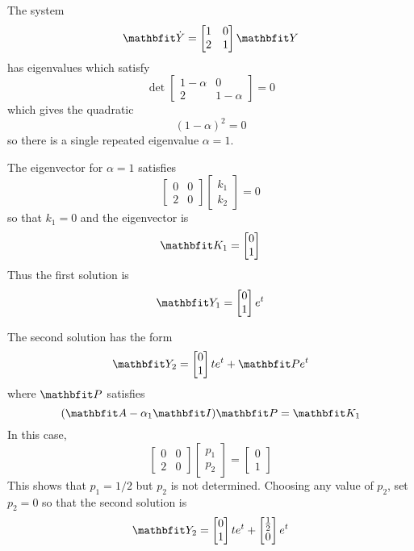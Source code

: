 \begin{example}
The system
$$\vect{\dot{Y}}=\begin{bmatrix} 1 & 0 \\ 2 & 1 \end{bmatrix} \vect{Y}$$
has eigenvalues which satisfy
$$\det \begin{bmatrix} 1-\alpha & 0 \\ 2 & 1-\alpha \end{bmatrix}=0$$
which gives the quadratic
$$(1-\alpha)^2=0$$
so there is a single repeated eigenvalue $\alpha=1$.

The eigenvector for $\alpha=1$ satisfies
$$\begin{bmatrix} 0 & 0 \\ 2 & 0\end{bmatrix}
\begin{bmatrix}k_1 \\ k_2 \end{bmatrix}=0$$
so that $k_1=0$ and the eigenvector is
$$\vect{K}_1=\begin{bmatrix} 0 \\ 1 \end{bmatrix}$$
Thus the first solution is
$$\vect{Y}_1=\begin{bmatrix} 0 \\ 1 \end{bmatrix}e^t$$

The second solution has the form
$$\vect{Y}_2=\begin{bmatrix} 0 \\ 1 \end{bmatrix}te^t+\vect{P}e^t$$
where $\vect{P}$ satisfies
$$(\vect{A}-\alpha_1\vect{I})\vect{P}=\vect{K}_1$$
In this case, 
$$\begin{bmatrix} 0 & 0 \\ 2 & 0\end{bmatrix}
\begin{bmatrix} p_1 \\ p_2 \end{bmatrix}=
\begin{bmatrix} 0 \\ 1 \end{bmatrix}$$
This shows that $p_1=1/2$ but $p_2$ is not determined.  Choosing any
value of $p_2$, set $p_2=0$ so that the second solution is
$$\vect{Y}_2=\begin{bmatrix} 0 \\ 1 \end{bmatrix}te^t+
\begin{bmatrix}\frac{1}{2} \\ 0 \end{bmatrix}e^t$$


\end{example}

